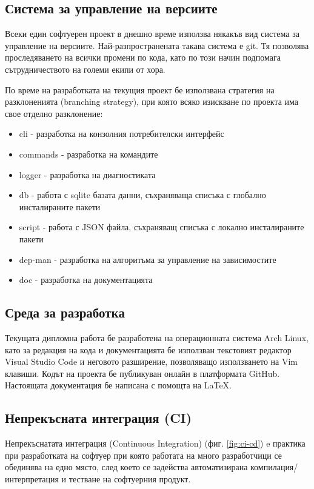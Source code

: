 \subsection{Система за управление на версиите}

Всеки един софтуерен проект в днешно време използва някакъв вид система за
управление на версиите. Най-разпространената такава система е git. Тя позволява
проследяването на всички промени по кода, като по този начин подпомага
сътрудничеството на големи екипи от хора.

По време на разработката на текущия проект бе използвана стратегия на
разклоненията (branching strategy), при която всяко изискване по проекта има
свое отделно разклонение:

\begin{itemize}
    \item cli - разработка на конзолния потребителски интерфейс
    \item commands - разработка на командите
    \item logger - разработка на диагностиката
    \item db - работа с sqlite базата данни, съхраняваща списъка с глобално
          инсталираните пакети
    \item script - работа с JSON файла, съхраняващ списъка с локално
          инсталираните пакети
    \item dep-man - разработка на алгоритъма за управление на зависимостите
    \item doc - разработка на документацията
\end{itemize}


\subsection{Среда за разработка}

Текущата дипломна работа бе разработена на операционната система Arch Linux,
като за редакция на кода и документацията бе използван текстовият редактор
Visual Studio Code и неговото разширение, позволяващо използването на Vim
клавиши. Кодът на проекта бе публикуван онлайн в платформата GitHub. Настоящата
документация бе написана с помощта на \LaTeX.


\subsection{Непрекъсната интеграция (CI)}

Непрекъснатата интеграция (Continuous Integration) (фиг. \ref{fig:ci-cd}) e
практика при разработката на софтуер при която работата на много разработчици се
обединява на едно място, след което се задейства автоматизирана
компилация/интерпретация и тестване на софтуерния продукт.

